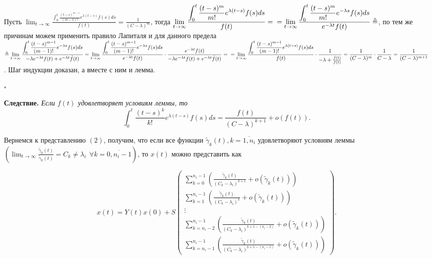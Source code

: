 \documentclass[12pt, a4paper]{article}
\begin{document}
\quad Пусть $\displaystyle\lim_{t \rightarrow \infty} \frac{\displaystyle\int_0^t\frac{(t-s)^{m-1}}{(m-1)!} e^{\lambda (t-s)}f(s)ds}{f(t)} = \frac{1}{(C-\lambda)^m}$, тогда $\displaystyle\lim_{t \rightarrow \infty} \frac{\displaystyle\int_0^t\frac{(t-s)^{m}}{m!} e^{\lambda (t-s)}f(s)ds}{f(t)} = \\ = \lim_{t \rightarrow \infty} \frac{\displaystyle\int_0^t\frac{(t-s)^{m}}{m!} e^{-\lambda s}f(s)ds}{e^{-\lambda t}f(t)} \triangleq$, по тем же причинам можем применить правило Лапиталя и для данного предела $\triangleq \displaystyle\lim_{t \rightarrow \infty} \frac{\displaystyle\int_0^t\frac{(t-s)^{m-1}}{(m-1)!} e^{-\lambda s}f(s)ds}{-\lambda e^{-\lambda t}f(t) + e^{-\lambda t}\dot{f}(t)} = \lim_{t \rightarrow \infty} \frac{\displaystyle\int_0^t\frac{(t-s)^{m-1}}{(m-1)!} e^{-\lambda s}f(s)ds}{e^{-\lambda t}f(t)} \cdot \frac{e^{-\lambda t}f(t)}{-\lambda e^{-\lambda t}f(t) + e^{-\lambda t}\dot{f}(t)} = \\ = \lim_{t \rightarrow \infty} \frac{\displaystyle\int_0^t\frac{(t-s)^{m-1}}{(m-1)!} e^{\lambda (t-s)}f(s)ds}{f(t)}\cdot \frac{1}{-\lambda + \frac{\dot{f}(t)}{f(t)}} = \frac{1}{(C-\lambda)^m} \cdot \frac{1}{C-\lambda} = \frac{1}{(C-\lambda)^{m+1}}$. Шаг индукции доказан, а вместе с ним и лемма.
\begin{flushright} $\square$ \end{flushright}

\newpage

\quad \textbf{Следствие.}  \textit{Если $f(t)$ удовлетворяет условиям леммы, то}
\[\displaystyle\int_0^t\frac{(t-s)^k}{k!} e^{\lambda (t-s)}f(s)ds = \frac{f(t)}{(C-\lambda)^{k+1}} + o(f(t)).\]

\quad Вернемся к представлению $(2)$, получим, что если все функции $\widetilde{\gamma}_k(t), k = \overline{1,n_i}$ удовлетворяют условиям леммы $\left(\displaystyle\lim_{t \rightarrow \infty}\frac{\dot{\widetilde{\gamma}}_k(t)}{\widetilde{\gamma}_k(t)} = C_k \neq \lambda_i \:\: \forall k=\overline{0, n_i-1}\right)$, то $x(t)$ можно представить как 

\[
x(t) = Y(t)x(0) + S
\left(
\begin{array}{c}
\displaystyle \sum_{k=0}^{n_i - 1}\left(\frac{\widetilde{\gamma}_k(t)}{(C_k-\lambda_i)^{k+1}} + o(\widetilde{\gamma}_k(t))\right) \\
\displaystyle \sum_{k=1}^{n_i - 1}\left(\frac{\widetilde{\gamma}_k(t)}{(C_k-\lambda_i)^{k}} + o(\widetilde{\gamma}_k(t))\right) \\
\vdots \\
\displaystyle \sum_{k=n_i-2}^{n_i - 1}\left(\frac{\widetilde{\gamma}_k(t)}{(C_k-\lambda_i)^{k+1-(n_i-2)}} + o(\widetilde{\gamma}_k(t))\right) \\
\displaystyle \sum_{k=n_i-1}^{n_i - 1}\left(\frac{\widetilde{\gamma}_k(t)}{(C_k-\lambda_i)^{k+1-(n_i-1)}} + o(\widetilde{\gamma}_k(t))\right)
\end{array}
\right)
.
\]
\end{document}
